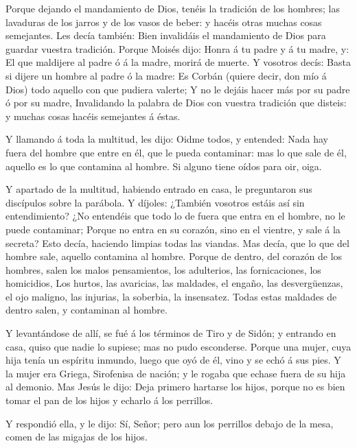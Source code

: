  Porque dejando el mandamiento de Dios, tenéis la tradición
de los hombres; las lavaduras de los jarros y de los vasos de beber: y
hacéis otras muchas cosas semejantes.  Les decía también:
Bien invalidáis el mandamiento de Dios para guardar vuestra tradición.
 Porque Moisés dijo: Honra á tu padre y á tu madre, y: El
que maldijere al padre ó á la madre, morirá de muerte.  Y
vosotros decís: Basta si dijere un hombre al padre ó la madre: Es Corbán
(quiere decir, don mío á Dios) todo aquello con que pudiera valerte;
 Y no le dejáis hacer más por su padre ó por su madre,
 Invalidando la palabra de Dios con vuestra tradición que
disteis: y muchas cosas hacéis semejantes á éstas.

 Y llamando á toda la multitud, les dijo: Oidme todos, y
entended:  Nada hay fuera del hombre que entre en él, que
le pueda contaminar: mas lo que sale de él, aquello es lo que contamina
al hombre.  Si alguno tiene oídos para oir, oiga.

 Y apartado de la multitud, habiendo entrado en casa, le
preguntaron sus discípulos sobre la parábola.  Y díjoles:
¿También vosotros estáis así sin entendimiento? ¿No entendéis que todo
lo de fuera que entra en el hombre, no le puede contaminar;
 Porque no entra en su corazón, sino en el vientre, y sale
á la secreta? Esto decía, haciendo limpias todas las viandas.
 Mas decía, que lo que del hombre sale, aquello contamina
al hombre.  Porque de dentro, del corazón de los hombres,
salen los malos pensamientos, los adulterios, las fornicaciones, los
homicidios,  Los hurtos, las avaricias, las maldades, el
engaño, las desvergüenzas, el ojo maligno, las injurias, la soberbia, la
insensatez.  Todas estas maldades de dentro salen, y
contaminan al hombre.

 Y levantándose de allí, se fué á los términos de Tiro y de
Sidón; y entrando en casa, quiso que nadie lo supiese; mas no pudo
esconderse.  Porque una mujer, cuya hija tenía un espíritu
inmundo, luego que oyó de él, vino y se echó á sus pies.  Y
la mujer era Griega, Sirofenisa de nación; y le rogaba que echase fuera
de su hija al demonio.  Mas Jesús le dijo: Deja primero
hartarse los hijos, porque no es bien tomar el pan de los hijos y
echarlo á los perrillos.

 Y respondió ella, y le dijo: Sí, Señor; pero aun los
perrillos debajo de la mesa, comen de las migajas de los hijos.

